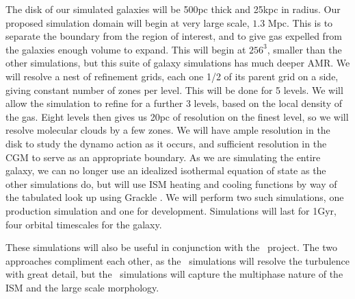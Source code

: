 The disk of our simulated galaxies will be 500pc thick and 25kpc in radius.  Our
proposed simulation domain will begin at very large scale, $1.3$ Mpc.  This is to
separate the boundary from the region of interest, and to give gas expelled from
the galaxies
enough volume to expand.  This will begin at $256^3$, smaller than the
other simulations, but this suite of galaxy simulations has much deeper AMR.  We will resolve a nest of refinement grids, each one
1/2 of its parent grid on a side, giving constant number of zones per level.
This will be done for 5 levels.  We will allow the simulation to 
refine for a further 3 levels, based on the local density of the gas.  Eight
levels then gives us 20pc of resolution on the finest
level, so we will resolve molecular clouds by a few zones.  We will have ample
resolution in the disk to study the dynamo action as it occurs, and sufficient
resolution in the CGM to serve as an appropriate boundary.  As we are simulating
the entire galaxy, we can no longer use an idealized isothermal equation of
state as the other simulations do, but will use ISM heating and cooling functions by way of the
tabulated look up using Grackle \citep{Smith17}.  We will perform two such
simulations, one production simulation and one for development.
Simulations will last for 1Gyr, four orbital timescales for the galaxy. 

These simulations will also be useful in conjunction with the \nameCMB\ project.
The two approaches compliment each other, as the \nameCMB\ simulations will
resolve the turbulence with great detail, but the \nameGalaxies\ simulations
will capture the multiphase nature of the ISM and the large scale morphology.
